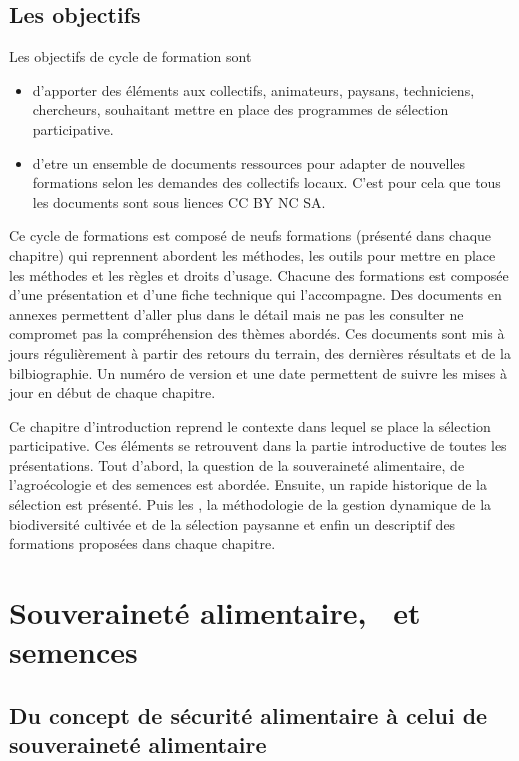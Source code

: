 \subsection{Les objectifs}
Les objectifs de cycle de formation sont

\begin{itemize}
\item d'apporter des éléments aux collectifs, animateurs, paysans, techniciens, chercheurs, souhaitant mettre en place des programmes de sélection participative.
\item d'etre un ensemble de documents ressources pour adapter de nouvelles formations selon les demandes des collectifs locaux. C'est pour cela que tous les documents sont sous liences CC BY NC SA.
\end{itemize}

Ce cycle de formations est composé de neufs formations (présenté dans chaque chapitre) qui reprennent abordent les méthodes, les outils pour mettre en place les méthodes et les règles et droits d’usage.
Chacune des formations est composée d’une présentation et d’une fiche technique qui l’accompagne. 
Des documents en annexes permettent d’aller plus dans le détail mais ne pas les consulter ne
compromet pas la compréhension des thèmes abordés. 
Ces documents sont mis à jours régulièrement à partir des retours du terrain, des dernières résultats et de la bilbiographie. 
Un numéro de version et une date permettent de suivre les mises à jour en début de chaque chapitre.

Ce chapitre d'introduction reprend le contexte dans lequel se place la sélection participative.
Ces éléments se retrouvent dans la partie introductive de toutes les présentations.
Tout d'abord, la question de la souveraineté alimentaire, de l'agroécologie et des semences est abordée.
Ensuite, un rapide historique de la sélection est présenté.
Puis les \MSPs, 
la méthodologie de la gestion dynamique de la biodiversité cultivée et de la sélection paysanne et enfin
un descriptif des formations proposées dans chaque chapitre.

\newpage


\section{Souveraineté alimentaire, \agec~et semences}
\subsection{Du concept de sécurité alimentaire à celui de souveraineté alimentaire}

